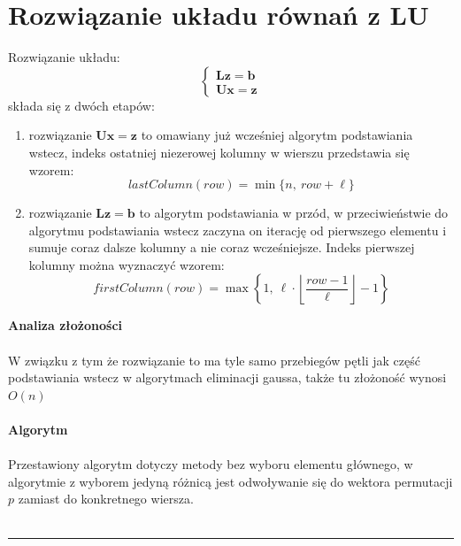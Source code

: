 \documentclass{article}
\newcommand{\mL}{\bm{L}}
\newcommand{\mU}{\bm{U}}
\newcommand{\vb}{\bm{b}}
\newcommand{\vx}{\bm{x}}
\begin{document}
\section*{Rozwiązanie układu równań z LU}
Rozwiązanie układu:
$$
\left\{ \begin{array}{l}
\mL\bm{z} = \vb\\
\mU\vx = \bm{z}
\end{array} \right.
$$ 
składa się z dwóch etapów:
\begin{enumerate}
	\item rozwiązanie $\mU\vx = \bm{z}$ to omawiany już wcześniej algorytm podstawiania wstecz, indeks ostatniej niezerowej kolumny w wierszu przedstawia się wzorem:
	$$lastColumn(row) = \min\{n,~row + \ell\}$$
	\item rozwiązanie $\mL\bm{z} = \vb$ to algorytm podstawiania w przód, w przeciwieństwie do algorytmu podstawiania wstecz zaczyna on iterację od pierwszego elementu i sumuje coraz dalsze kolumny a nie coraz wcześniejsze. Indeks pierwszej kolumny można wyznaczyć wzorem:
	$$	firstColumn(row) = \max\left\lbrace 1,~\ell \cdot \left \lfloor\frac{row - 1}{\ell}\right \rfloor-1\right\rbrace$$
\end{enumerate}
\noindent \textbf{Analiza złożoności}\\\\
W związku z tym że rozwiązanie to ma tyle samo przebiegów pętli jak część podstawiania wstecz w algorytmach eliminacji gaussa, także tu złożoność wynosi $O(n)$\\\\
\noindent \textbf{Algorytm}\\\\
Przestawiony algorytm dotyczy metody bez wyboru elementu głównego, w algorytmie z wyborem jedyną różnicą jest odwoływanie się do wektora permutacji $p$ zamiast do konkretnego wiersza.\\\\
\rule{\textwidth}{0.4pt}
\end{document}
